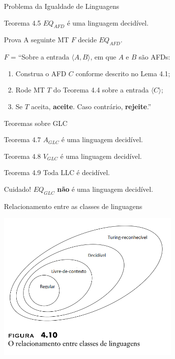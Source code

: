 \documentclass[xcolor=dvipsnames,table]{beamer}
\begin{document}
	\begin{frame}{Problema da Igualdade de Linguagens}
		\begin{block}{Teorema 4.5}
			$EQ_{AFD}$ é uma linguagem decidível.
		\end{block} \pause
		\begin{block}{Prova}
			A seguinte MT $F$ decide $EQ_{AFD}$.
			
			$F$ = ``Sobre a entrada $\langle A, B \rangle$, em que $A$ e $B$ são AFDs:
			\begin{enumerate}
				\item Construa o AFD $C$ conforme descrito no Lema 4.1;
				\item Rode MT $T$ do Teorema 4.4 sobre a entrada $\langle C \rangle$;
				\item Se $T$ aceita, {\bf aceite}. Caso contrário, {\bf rejeite}.''
			\end{enumerate}
		\end{block}
	\end{frame}
	
	\begin{frame}{Teoremas sobre GLC}
		\begin{block}{Teorema 4.7}
			$A_{GLC}$ é uma linguagem decidível.
		\end{block}
		\begin{block}{Teorema 4.8}
			$V_{GLC}$ é uma linguagem decidível.
		\end{block}
		\begin{block}{Teorema 4.9}
			Toda LLC é decidível.
		\end{block} \pause
		\begin{alertblock}{Cuidado!}
			$EQ_{GLC}$ {\color{red} {\bf não}} é uma linguagem decidível.
		\end{alertblock}
	\end{frame}
	
	\begin{frame}{Relacionamento entre as classes de linguagens}
		\begin{center}
			\includegraphics[width=9cm]{images/fig410.png}
		\end{center}
	\end{frame}
	
\end{document}
